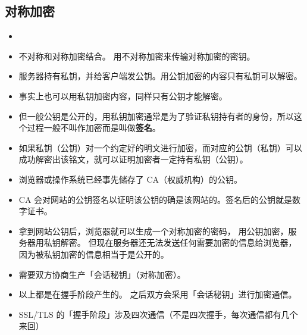 
\subsection{对称加密}
\begin{itemize}
\item 
\end{itemize}


\begin{itemize}
\item 不对称和对称加密结合。 用不对称加密来传输对称加密的密钥。
\item 服务器持有私钥，并给客户端发公钥。用公钥加密的内容只有私钥可以解密。
\item 事实上也可以用私钥加密内容，同样只有公钥才能解密。
\item 但一般公钥是公开的，用私钥加密通常是为了验证私钥持有者的身份，所以这个过程一般不叫作加密而是叫做\textbf{签名}。
\item 如果私钥（公钥）对一个约定好的明文进行加密，而对应的公钥（私钥）可以成功解密出该铭文，就可以证明加密者一定持有私钥（公钥）。
\item 浏览器或操作系统已经事先储存了 CA（权威机构）的公钥。
\item CA 会对网站的公钥签名以证明该公钥的确是该网站的。签名后的公钥就是数字证书。
\item 拿到网站公钥后，浏览器就可以生成一个对称加密的密码， 用公钥加密，服务器用私钥解密。 但现在服务器还无法发送任何需要加密的信息给浏览器，因为被私钥加密的信息相当于是公开的。
\item 需要双方协商生产「会话秘钥」（对称加密）。
\item 以上都是在握手阶段产生的。 之后双方会采用「会话秘钥」进行加密通信。
\item SSL/TLS 的「握手阶段」涉及四次通信（不是四次握手，每次通信都有几个来回）
\end{itemize}
